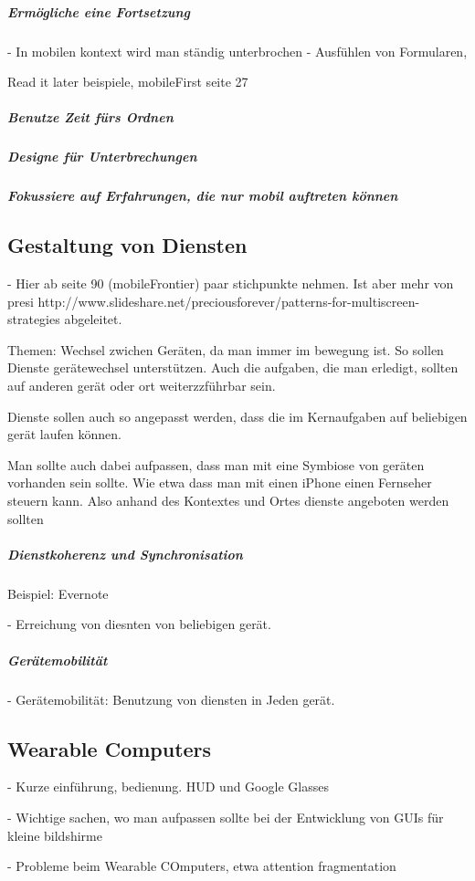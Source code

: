 \subparagraph{Ermögliche eine Fortsetzung}
\label{subp:erm_gliche_eine_fortsetzung}

- In mobilen kontext wird man ständig unterbrochen
- Ausfühlen von Formularen, 

Read it later beispiele, mobileFirst seite 27

\subparagraph{Benutze Zeit fürs Ordnen}
\label{subp:benutze_zeit_als_ordnungsprinzip}


\subparagraph{Designe für Unterbrechungen} %
\label{subp:designe_f_r_unterbrechungen}


\subparagraph{Fokussiere auf Erfahrungen, die nur mobil auftreten können} %
\label{subp:fokussiere_auf_erfahrungen_die_nur_mobil_auftreten_k_nnen}


\subsection{Gestaltung von Diensten}
\label{sub:gestaltung_von_diensten}

- Hier ab seite 90 (mobileFrontier) paar stichpunkte nehmen. Ist aber mehr von presi http://www.slideshare.net/preciousforever/patterns-for-multiscreen-strategies abgeleitet. 

Themen: Wechsel zwichen Geräten, da man immer im bewegung ist. So sollen Dienste gerätewechsel unterstützen. Auch die aufgaben, die man erledigt, sollten auf anderen gerät oder ort weiterzzführbar sein.

Dienste sollen auch so angepasst werden, dass die im Kernaufgaben auf beliebigen gerät laufen können.

Man sollte auch dabei aufpassen, dass man mit eine Symbiose von geräten vorhanden sein sollte. Wie etwa dass man mit einen iPhone einen Fernseher steuern kann. Also anhand des Kontextes und Ortes dienste angeboten werden sollten

\subparagraph{Dienstkoherenz und Synchronisation}
\label{subp:diensmobilit_t}

Beispiel: Evernote

- Erreichung von diesnten von beliebigen gerät.


\subparagraph{Gerätemobilität} 
\label{subp:ger_temobilit_t}

- Gerätemobilität: Benutzung von diensten in Jeden gerät. 



\subsection{Wearable Computers} 
\label{sub:wearable_computers}

- Kurze einführung, bedienung. HUD und Google Glasses

- Wichtige sachen, wo man aufpassen sollte bei der Entwicklung von GUIs für kleine bildshirme

- Probleme beim Wearable COmputers, etwa attention fragmentation

